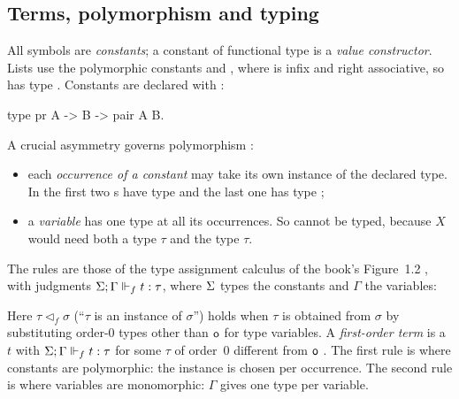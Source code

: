 \subsection{Terms, polymorphism and typing}

All symbols are \emph{constants}; a constant of functional type is a \emph{value constructor}. Lists use
the polymorphic constants  and , where \lp{::} is infix and
right associative, so  has type  . Constants are declared with
 :
\begin{lprolog}
type  pr  A -> B -> pair A B.
\end{lprolog}
A crucial asymmetry governs polymorphism :
\begin{itemize}
  \item each \emph{occurrence of a constant} may take its own instance of the declared type. In
     the first two s have type  and the last
    one has type ;
  \item a \emph{variable} has one type at all its occurrences. So  cannot be
    typed, because $X$ would need both a type $\tau$ and the type  $\tau$.
\end{itemize}
The rules are those of the type assignment calculus of the book's Figure~1.2 , with judgments
$\Sigma;\Gamma\Vdash_f t:\tau$, where $\Sigma$ types the constants and $\Gamma$ the variables:
Here $\tau\vartriangleleft_f\sigma$ (``$\tau$ is an instance of $\sigma$'') holds when $\tau$ is obtained from
$\sigma$ by substituting order-0 types other than $\mathsf{o}$ for type variables. A \emph{first-order term} is a
$t$ with $\Sigma;\Gamma\Vdash_f t:\tau$ for some $\tau$ of order~0 different from $\mathsf{o}$ . The
first rule is where constants are polymorphic: the instance is chosen per occurrence. The second rule is
where variables are monomorphic: $\Gamma$ gives one type per variable.


